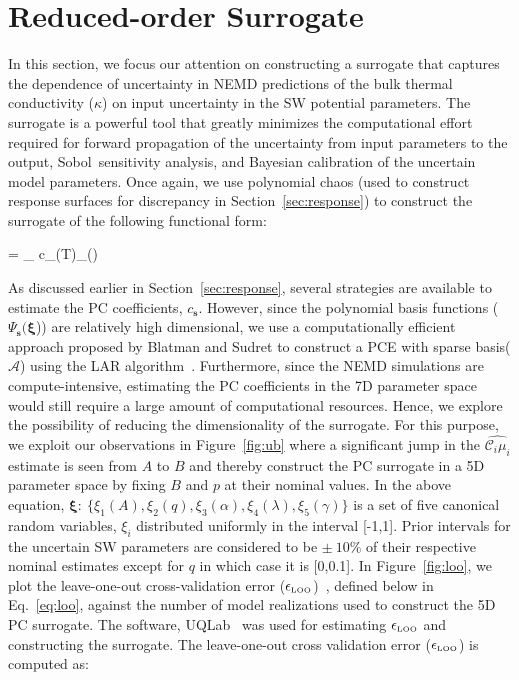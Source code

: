 \section{Reduced-order Surrogate}
\label{sec:ros}

In this section, we focus our attention on constructing a surrogate that captures the dependence of
uncertainty in NEMD predictions of the bulk thermal conductivity ($\kappa$) on input uncertainty
in the SW potential parameters. The surrogate is a powerful tool that greatly minimizes
the computational
effort required for forward propagation of the uncertainty from input parameters to the output,
Sobol\textquotesingle~sensitivity analysis, and Bayesian calibration of the uncertain model parameters. Once again,
we use polynomial chaos (used to construct response surfaces for discrepancy in
Section~\ref{sec:response}) to construct the surrogate of the following functional form:

\be
\kappa  = \sum\limits_{\in{}} c_{}(T)\Psi_{}(\bm{\xi})
\ee

As discussed earlier in Section~\ref{sec:response}, several strategies are available to
estimate the PC coefficients, $c_{\bm{s}}$. However, since the polynomial basis functions
($\Psi_{\bm{s}}(\bm{\xi}$)) are
relatively high dimensional, we use a computationally efficient approach proposed by
Blatman and Sudret to construct a PCE with sparse basis($\mathcal{A}$) using the LAR
algorithm~\cite{Blatman:2011}. Furthermore, since the NEMD simulations are compute-intensive,
estimating the PC coefficients in the 7D parameter space would still require a large amount of
computational resources. Hence, we explore the possibility of reducing the dimensionality of
the surrogate. For this purpose, we 
exploit our observations in Figure~\ref{fig:ub} where a significant
jump in the $\hat{\mathcal{C}_i\mu_i}$ estimate is seen from $A$ to $B$ and thereby construct the 
PC surrogate in a 5D parameter space by fixing $B$ and $p$ at their nominal values. In the above
equation, $\bm{\xi}:~\{\xi_1(A),\xi_2(q),\xi_3(\alpha),\xi_4(\lambda),\xi_5(\gamma)\}$ is a set
of five canonical random variables, $\xi_i$ distributed uniformly in the interval [-1,1].
Prior intervals for the uncertain SW parameters are considered to be
$\pm~10\%$ of their respective nominal estimates except for $q$ in which case it is [0,0.1]. In
Figure~\ref{fig:loo}, we plot the leave-one-out cross-validation error 
($\epsilon_{\tiny{\mbox{LOO}}}$)~\cite{Blatman:2010}, defined
below in Eq.~\ref{eq:loo}, against the number of model realizations used to construct the 5D
PC surrogate. The software, UQLab~\cite{Marelli:2014} was used for estimating $\epsilon_{\tiny{\mbox{LOO}}}$
and constructing the surrogate. The leave-one-out cross validation error ($\epsilon_{\tiny{\mbox{LOO}}}$) is
computed as:

